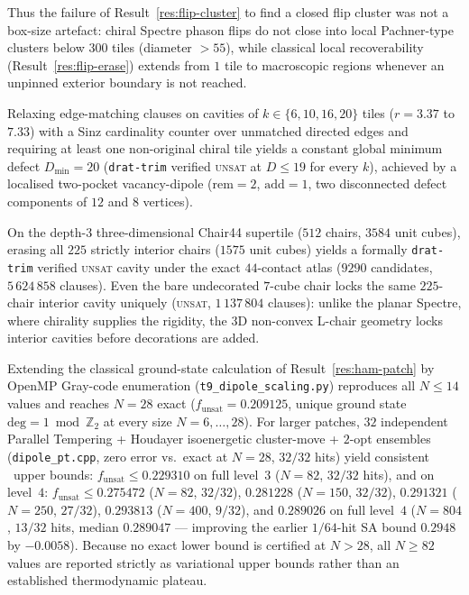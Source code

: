 Thus the failure of Result~\ref{res:flip-cluster} to find a closed flip cluster was not a box-size artefact: chiral Spectre phason flips do not close into local Pachner-type clusters below $300$ tiles (diameter $>55$), while classical local recoverability (Result~\ref{res:flip-erase}) extends from $1$ tile to macroscopic regions whenever an unpinned exterior boundary is not reached.

\begin{result}[\exact]\label{res:sat-defect}
Relaxing edge-matching clauses on cavities of $k\in\{6,10,16,20\}$ tiles ($r=3.37$ to $7.33$) with a Sinz cardinality counter over unmatched directed edges and requiring at least one non-original chiral tile yields a constant global minimum defect $D_{\min}=20$ (\texttt{drat-trim} verified \textsc{unsat} at $D\le19$ for every $k$), achieved by a localised two-pocket vacancy-dipole ($\mathrm{rem}=2$, $\mathrm{add}=1$, two disconnected defect components of $12$ and $8$ vertices).
\end{result}

\begin{result}[\exact]\label{res:chair44-sat}
On the depth-$3$ three-dimensional Chair44 supertile ($512$ chairs, $3584$ unit cubes), erasing all $225$ strictly interior chairs ($1575$ unit cubes) yields a formally \texttt{drat-trim} verified \textsc{unsat} cavity under the exact $44$-contact atlas ($9290$ candidates, $5\,624\,858$ clauses). Even the bare undecorated $7$-cube chair locks the same $225$-chair interior cavity uniquely (\textsc{unsat}, $1\,137\,804$ clauses): unlike the planar Spectre, where chirality supplies the rigidity, the 3D non-convex L-chair geometry locks interior cavities before decorations are added.
\end{result}

\begin{result}\label{res:dipole-scale}
Extending the classical ground-state calculation of Result~\ref{res:ham-patch} by OpenMP Gray-code enumeration (\texttt{t9\_dipole\_scaling.py}) reproduces all $N\le14$ values and reaches $N=28$ exact ($f_{\mathrm{unsat}}=0.209125$, unique ground state $\mathrm{deg}=1\bmod\mathbb{Z}_2$ at every size $N=6,\dots,28$). For larger patches, $32$ independent Parallel Tempering + Houdayer isoenergetic cluster-move + $2$-opt ensembles (\texttt{dipole\_pt.cpp}, zero error vs.\ exact at $N=28$, $32/32$ hits) yield consistent \numeric\ upper bounds: $f_{\mathrm{unsat}}\le0.229310$ on full level~$3$ ($N=82$, $32/32$ hits), and on level~$4$: $f_{\mathrm{unsat}}\le0.275472$ ($N=82$, $32/32$), $0.281228$ ($N=150$, $32/32$), $0.291321$ ($N=250$, $27/32$), $0.293813$ ($N=400$, $9/32$), and $0.289026$ on full level~$4$ ($N=804$, $13/32$ hits, median $0.289047$ — improving the earlier $1/64$-hit SA bound $0.2948$ by $-0.0058$). Because no exact lower bound is certified at $N>28$, all $N\ge82$ values are reported strictly as variational upper bounds rather than an established thermodynamic plateau.
\end{result}

